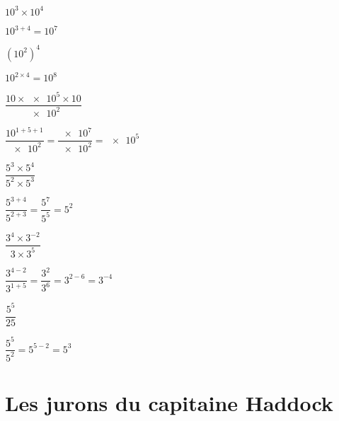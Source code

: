 \documentclass[a4paper,11pt]{exam}
\begin{document}
\begin{multicols}{2}
	
	\begin{questions}
		\question $10^3 \times 10^4$
	
		\begin{solution}
			$10^{3+4} = 10^7$
		\end{solution}
	
		\question $(10^2)^4$
	
		\begin{solution}
			$10^{2 \times 4} = 10^8$
		\end{solution}
	
		\question  $\dfrac{10 \times \num{e5} \times \num{10}}{\num{e2}} $
		\begin{solution}
			$\dfrac{10^{1+5+1}}{\num{e2}}=\dfrac{\num{e7}}{\num{e2}}=\num{e5}$
		\end{solution}
	    
	    \vspace*{0.5cm}
	     
		\question $\dfrac{5^3 \times 5^4}{5^2 \times 5^3}$
		\begin{solution}
			$\dfrac{5^{3+4}}{5^{2+3}} = \dfrac{5^7}{5^5} = 5^2$
		\end{solution}
	
		\question $\dfrac{3^{4} \times 3^{-2}}{3 \times 3^{5}}$
		\begin{solution}
			$\dfrac{3^{4-2}}{3^{1+5}} = \dfrac{3^{2}}{3^{6}} = 3^{2-6} = 3^{-4}$
		\end{solution}
		
		\question $\dfrac{5^{5}}{25}$
		\begin{solution}
			$\dfrac{5^{5}}{5^{2}} = 5^{5-2} = 5^3$
		\end{solution}
	\end{questions}
\end{multicols}
	
\section{Les jurons du capitaine Haddock}
	
\end{document}
